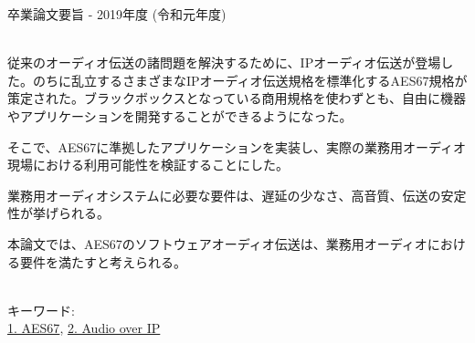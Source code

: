卒業論文要旨 - 2019年度 (令和元年度)
\begin{center}
\begin{large}
\end{large}
\end{center}

~ \\

従来のオーディオ伝送の諸問題を解決するために、IPオーディオ伝送が登場した。のちに乱立するさまざまなIPオーディオ伝送規格を標準化するAES67規格が策定された。ブラックボックスとなっている商用規格を使わずとも、自由に機器やアプリケーションを開発することができるようになった。

そこで、AES67に準拠したアプリケーションを実装し、実際の業務用オーディオ現場における利用可能性を検証することにした。

業務用オーディオシステムに必要な要件は、遅延の少なさ、高音質、伝送の安定性が挙げられる。

本論文では、AES67のソフトウェアオーディオ伝送は、業務用オーディオにおける要件を満たすと考えられる。

~ \\
キーワード:\\
\underline{1. AES67},
\underline{2. Audio over IP}
\begin{flushright}
\dept \\
\author
\end{flushright}
